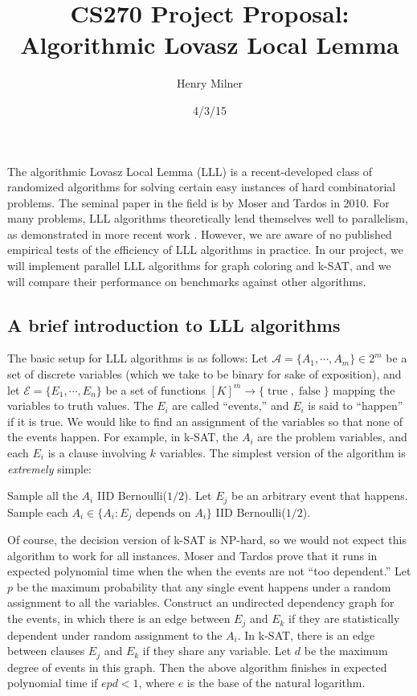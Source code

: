 \documentclass{article}
\author{Henry Milner}
\title{CS270 Project Proposal: Algorithmic Lovasz Local Lemma}
\date{4/3/15}
\begin{document}
\maketitle

The algorithmic Lovasz Local Lemma (LLL) is a recent-developed class of randomized algorithms for solving certain easy instances of hard combinatorial problems.  The seminal paper in the field is by Moser and Tardos \cite{moser2010constructive} in 2010.  For many problems, LLL algorithms theoretically lend themselves well to parallelism, as demonstrated in more recent work \cite{chung2014distributed,haeupler2011new}.  However, we are aware of no published empirical tests of the efficiency of LLL algorithms in practice.  In our project, we will implement parallel LLL algorithms for graph coloring and k-SAT, and we will compare their performance on benchmarks against other algorithms.

\subsection{A brief introduction to LLL algorithms}
The basic setup for LLL algorithms is as follows: Let $\mathcal{A} = \{A_1, \cdots, A_m\} \in 2^m$ be a set of discrete variables (which we take to be binary for sake of exposition), and let $\mathcal{E} = \{E_1, \cdots, E_n\}$ be a set of functions $[K]^m \to \{\operatorname{true},\operatorname{false}\}$ mapping the variables to truth values.  The $E_i$ are called ``events,'' and $E_i$ is said to ``happen'' if it is true.  We would like to find an assignment of the variables so that none of the events happen.  For example, in k-SAT, the $A_i$ are the problem variables, and each $E_i$ is a clause involving $k$ variables.  The simplest version of the algorithm is \emph{extremely} simple:

\begin{algorithmic}
\State Sample all the $A_i$ IID Bernoulli($1/2$).
  \State Let $E_j$ be an arbitrary event that happens.
  \State Sample each $A_i \in \{A_i: E_j\text{ depends on }A_i\}$ IID Bernoulli($1/2$).
\EndWhile
\end{algorithmic}

Of course, the decision version of k-SAT is NP-hard, so we would not expect this algorithm to work for all instances.  Moser and Tardos \cite{moser2010constructive} prove that it runs in expected polynomial time when the when the events are not ``too dependent.''  Let $p$ be the maximum probability that any single event happens under a random assignment to all the variables.  Construct an undirected dependency graph for the events, in which there is an edge between $E_j$ and $E_k$ if they are statistically dependent under random assignment to the $A_i$.  In k-SAT, there is an edge between clauses $E_j$ and $E_k$ if they share any variable.  Let $d$ be the maximum degree of events in this graph.  Then the above algorithm finishes in expected polynomial time if $e p d < 1$, where $e$ is the base of the natural logarithm.
\end{document}
